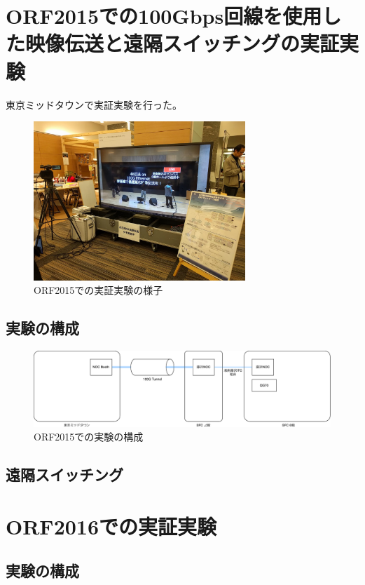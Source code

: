 \chapter{ORF2015での100Gbps回線を使用した映像伝送と遠隔スイッチングの実証実験}
\label{chap:orf2015}

東京ミッドタウンで実証実験を行った。
\begin{figure}[htbp]
    \begin{center}
        \includegraphics[bb=0 0 1200 900,width=8cm]{img/orf2015-IMG_20151121_132910.jpg}
    \end{center}
    \caption{ORF2015での実証実験の様子}
    \label{fig:orf2015-IMG_20151121_132910}
\end{figure}

\section{実験の構成}
\begin{figure}[htbp]
    \begin{center}
        \includegraphics[bb=0 0 1101 282,width=15.5cm]{img/orf2015-flow.pdf}
    \end{center}
    \caption{ORF2015での実験の構成}
    \label{fig:orf2015-flow}
\end{figure}

\section{遠隔スイッチング}

\chapter{ORF2016での実証実験}
\label{chap:orf2016}
\section{実験の構成}
